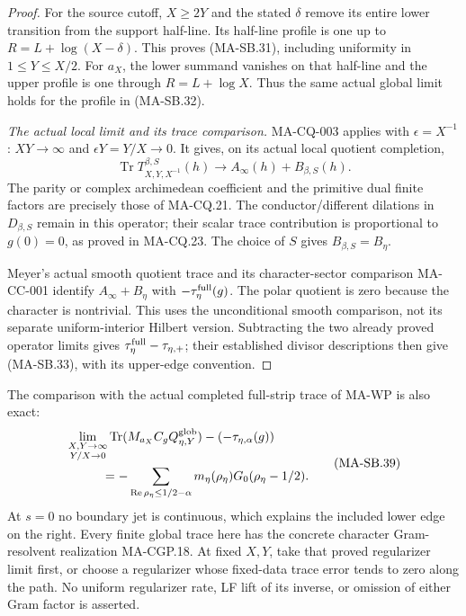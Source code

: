 \begin{proof}
For the source cutoff, $X\ge2Y$ and the stated
$\delta$ remove its entire lower transition from
the support half-line.  Its half-line profile is
one up to $R=L+\log(X-\delta)$.
This proves (MA-SB.31), including uniformity in
$1\le Y\le X/2$.
For $a_X$, the lower summand vanishes on that
half-line and the upper profile is one through
$R=L+\log X$.  Thus the same actual global limit
holds for the profile in (MA-SB.32).

\emph{The actual local limit and its trace comparison.}
MA-CQ-003 applies with $\epsilon=X^{-1}$:
$XY\to\infty$ and $\epsilon Y=Y/X\to0$.
It gives, on its actual local quotient completion,
\[
 \operatorname{Tr}T^{\beta,S}_{X,Y,X^{-1}}(h)
       \longrightarrow A_\infty(h)+B_{\beta,S}(h).
 \tag{MA-SB.38}
\]
The parity or complex archimedean coefficient and
the primitive dual finite factors are precisely
those of MA-CQ.21.  The conductor/different
dilations in $D_{\beta,S}$ remain in this operator;
their scalar trace contribution is proportional
to $g(0)=0$, as proved in MA-CQ.23.
The choice of $S$ gives $B_{\beta,S}=B_\eta$.

Meyer's actual smooth quotient trace and its
character-sector comparison MA-CC-001 identify
$A_\infty+B_\eta$ with
$-\tau_\eta^{\rm full}(g)$.  The polar quotient
is zero because the character is nontrivial.
This uses the unconditional smooth comparison,
not its separate uniform-interior Hilbert version.
Subtracting the two already proved operator
limits gives $\tau_\eta^{\rm full}-\tau_{\eta,+}$;
their established divisor descriptions then give
(MA-SB.33), with its upper-edge convention.
\end{proof}

The comparison with the actual completed full-strip
trace of MA-WP is also exact:
\[
 \begin{split}
 &\lim_{\substack{X,Y\to\infty\\Y/X\to0}}
    \operatorname{Tr}(M_{a_X}C_gQ_{\eta,Y}^{\rm glob})
       -\left(-\tau_{\eta,\alpha}(g)\right)\\
 &\hspace{10mm}=-\sum_{\operatorname{Re}\rho_\eta\le1/2-\alpha}
                  m_\eta(\rho_\eta)G_0(\rho_\eta-1/2).
 \end{split}
 \tag{MA-SB.39}
\]
At $s=0$ no boundary jet is continuous, which explains
the included lower edge on the right.
Every finite global trace here has the concrete
character Gram-resolvent realization MA-CGP.18.
At fixed $X,Y$, take that proved regularizer limit
first, or choose a regularizer whose fixed-data
trace error tends to zero along the path.
No uniform regularizer rate, LF lift of its inverse,
or omission of either Gram factor is asserted.

